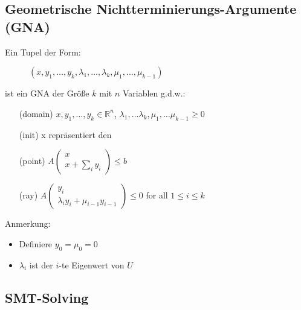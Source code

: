 \subsection{Geometrische Nichtterminierungs-Argumente (GNA)}
\begin{frame}
	\begin{definition}
		\label{def:gna}
		Ein Tupel der Form:
		\vspace{-1em}
		\begin{figure}
			\centering
			$(x, y_1, \dots, y_k, \lambda_1, \dots, \lambda_k, \mu_1, \dots, \mu_{k-1})$
		\end{figure}  
		\vspace{-1em}
		ist ein GNA der Gr\"o\ss e $k$ mit $n$ Variablen g.d.w.:
		\begin{itemize}
			\setlength{\itemindent}{1in}
			\item[(domain)] $x, y_1, \dots, y_k \in \mathbb{R}^n$, $\lambda_1, \dots \lambda_k, \mu_1, \dots \mu_{k-1} \ge 0$
			\item[(init)] x repr\"asentiert den \stem
			\item[(point)] $A\begin{pmatrix} x \\ x + \sum_i y_i \end{pmatrix} \le b$
			\item[(ray)] $A\begin{pmatrix} y_i \\ \lambda_i y_i + \mu_{i-1} y_{i-1} \end{pmatrix} \le 0$ for all $1 \le i \le k$
		\end{itemize}
		Anmerkung:
		\begin{itemize}
			\item Definiere $y_0 = \mu_0 = 0$
			\item $\lambda_i$ ist der $i$-te Eigenwert von $U$
		\end{itemize}
	\end{definition}
\end{frame}

\subsection{SMT-Solving}

